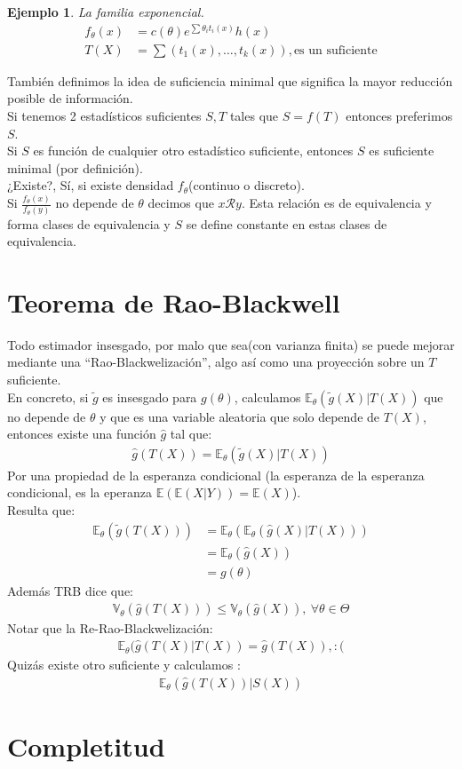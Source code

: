 \documentclass[10pt]{article}
\theoremstyle{plain}
\newtheorem{ej}{Ejemplo}
\theoremstyle{definition}
\begin{document}
\begin{ej} La familia exponencial.\\
\begin{align*}
f_{\theta}(x) &= c(\theta) e^{\sum \theta_{i}t_{i}(x)}h(x)\\
T(X) &= \sum (t_{1}(x), \ldots, t_{k}(x)) , \text{es un suficiente}
\end{align*}
\end{ej}

También definimos la idea de suficiencia minimal que significa la mayor reducción posible de información.\\
Si tenemos 2 estadísticos suficientes $S,T$ tales que $S=f(T)$ entonces preferimos $S$.\\
Si $S$ es función de cualquier otro estadístico suficiente, entonces $S$ es suficiente minimal (por definición).\\
¿Existe?, Sí, si existe densidad $f_{\theta}$(continuo o discreto).\\
Si $\frac{f_{\theta}(x)}{f_{\theta}(y)}$ no depende de $\theta$ decimos que $x\mathcal{R}y$. Esta relación es de equivalencia y forma clases de equivalencia y $S$ se define constante en estas clases de equivalencia.

\section{Teorema de Rao-Blackwell}
Todo estimador insesgado, por malo que sea(con varianza finita) se puede mejorar mediante una ``Rao-Blackwelización'', algo así como una proyección sobre un $T$ suficiente.\\
En concreto, si $\tilde{g}$ es insesgado para $g(\theta)$, calculamos $\mathbb{E}_{\theta}(\tilde{g}(X)|T(X))$ que no depende de $\theta$ y que es una variable aleatoria que solo depende de $T(X)$, entonces existe una función $\hat{g}$ tal que:
\begin{align*}
\hat{g}(T(X)) = \mathbb{E}_{\theta}(\tilde{g}(X)|T(X))
\end{align*}
Por una propiedad de la esperanza condicional (la esperanza de la esperanza condicional, es la eperanza $\mathbb{E}(\mathbb{E}(X|Y)) = \mathbb{E}(X)$). \\
Resulta que:
\begin{align*}
\mathbb{E}_{\theta}(\tilde{g}(T(X))) &= \mathbb{E}_{\theta}(\mathbb{E}_{\theta}(\hat{g}(X)|T(X)))\\
&= \mathbb{E}_{\theta}(\hat{g}(X))\\
&= g(\theta)
\end{align*}
Además TRB dice que:
\begin{align*}
\mathbb{V}_{\theta}(\hat{g}(T(X))) \le \mathbb{V}_{\theta}(\hat{g}(X)),\ \forall \theta \in \Theta
\end{align*}
Notar que la Re-Rao-Blackwelización:
\begin{align*}
\mathbb{E}_{\theta}(\hat{g}(T(X)|T(X)) = \hat{g}(T(X)), :(
\end{align*}
Quizás existe otro suficiente y calculamos :
\begin{align*}
\mathbb{E}_{\theta}(\hat{g}(T(X))|S(X))
\end{align*}
\section{Completitud}
\end{document}
